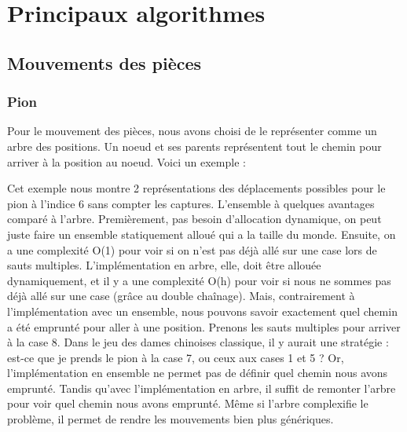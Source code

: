 \section{Principaux algorithmes}
\subsection{Mouvements des pièces}
\subsubsection{Pion}
Pour le mouvement des pièces, nous avons choisi de le représenter comme
un arbre des positions. Un noeud et ses parents représentent tout le
chemin pour arriver à la position au noeud. Voici un exemple :



Cet exemple nous montre 2 représentations des déplacements possibles pour
le pion à l'indice 6 sans compter les captures. L'ensemble à quelques avantages comparé à l'arbre.
Premièrement, pas besoin d'allocation dynamique, on peut juste faire un ensemble statiquement alloué
qui a la taille du monde. Ensuite, on a une complexité O(1) pour voir si on n'est pas déjà allé sur une case
lors de sauts multiples. L'implémentation en arbre, elle, doit être allouée dynamiquement,
et il y a une complexité O(h) pour voir si nous ne sommes pas déjà allé sur une case (grâce au double chaînage).
Mais, contrairement à l'implémentation avec un ensemble, nous pouvons savoir
exactement quel chemin a été emprunté pour aller à une position. Prenons les sauts
multiples pour arriver à la case 8. Dans le jeu des dames chinoises classique,
il y aurait une stratégie : est-ce que je prends le pion à la case 7, ou ceux aux cases 1 et 5 ?
Or, l'implémentation en ensemble ne permet pas de définir quel chemin nous avons emprunté.
Tandis qu'avec l'implémentation en arbre, il suffit de remonter l'arbre pour voir quel chemin nous avons emprunté.
Même si l'arbre complexifie le problème, il permet de rendre les mouvements bien plus génériques.


